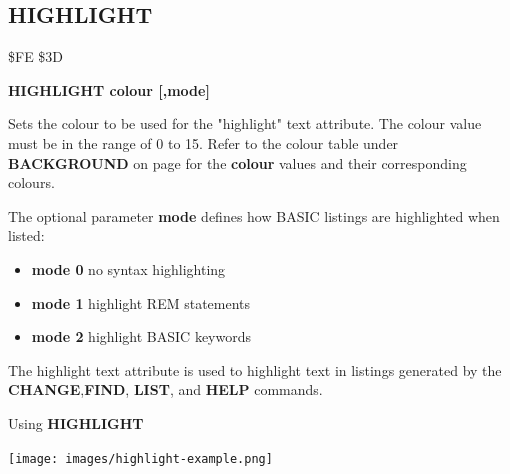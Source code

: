 
\newpage
\subsection{HIGHLIGHT}
\begin{description}[leftmargin=2cm,style=nextline]
\item [Token:] \$FE \$3D
\item [Format:] {\bf HIGHLIGHT colour [,mode]}
\item [Usage:] Sets the colour
               to be used for the "highlight" text attribute.
               The colour value must be in the
               range of 0 to 15. Refer to the colour table under {\bf BACKGROUND} on page \pageref{colourtable}
               for the {\bf colour} values and their corresponding colours.

               The optional parameter {\bf mode} defines how
               BASIC listings are highlighted when listed:

               \begin{itemize}
                 \item {\bf mode 0} no syntax highlighting
                 \item {\bf mode 1} highlight REM statements
                 \item {\bf mode 2} highlight BASIC keywords
               \end{itemize}

\item [Remarks:] The highlight text attribute is used to highlight text
               in listings generated by the {\bf CHANGE},{\bf FIND},
               {\bf LIST}, and {\bf HELP} commands.
\item [Example:] Using {\bf HIGHLIGHT}
\item \begin{center}\texttt{[image: images/highlight-example.png]}\end{center}
\end{description}


\newpage
